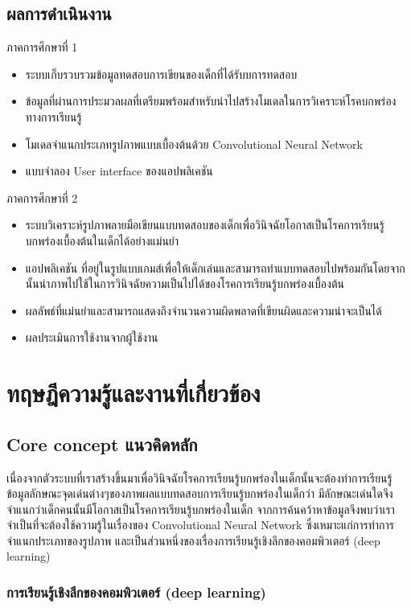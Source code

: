 \documentclass[12pt,oneside,openright,a4paper]{cpe-thai-project}
\begin{document}
\section{ผลการดำเนินงาน}
ภาคการศึกษาที่ 1 
\begin{itemize}
  \item ระบบเก็บรวบรวมข้อมูลทดสอบการเขียนของเด็กที่ได้รับบการทดสอบ
  \item ข้อมูลที่ผ่านการประมวลผลที่เตรียมพร้อมสำหรับนำไปสร้างโมเดลในการวิเคราะห์โรคบกพร่องทางการเรียนรู้
  \item โมเดลจำแนกประเภทรูปภาพแบบเบื้องต้นด้วย Convolutional Neural Network
  \item แบบจำลอง User interface ของแอปพลิเคชัน
\end{itemize}
ภาคการศึกษาที่ 2 
\begin{itemize}
  \item ระบบวิเคราะห์รูปภาพลายมือเขียนแบบทดสอบของเด็กเพื่อวินิจฉัยโอกาสเป็นโรคการเรียนรู้บกพร่องเบื้องต้นในเด็กได้อย่างแม่นยำ
  \item แอปพลิเคชัน ที่อยู่ในรูปแบบเกมส์เพื่อให้เด็กเล่นและสามารถทำแบบทดสอบไปพร้อมกันโดยจากนั้นนำภาพไปใช้ในการวินิจฉัยความเป็นไปได้ของโรคการเรียนรู้บกพร่องเบื้องต้น
  \item ผลลัพธ์ที่แม่นยำและสามารถแสดงถึงจำนวนความผิดพลาดที่เขียนผิดและความน่าจะเป็นได้
  \item ผลประเมินการใช้งานจากผู้ใช้งาน
\end{itemize}
\chapter{ทฤษฎีความรู้และงานที่เกี่ยวข้อง}
\section{Core concept แนวคิดหลัก}
เนื่องจากตัวระบบที่เราสร้างขึ้นมาเพื่อวินิจฉัยโรคการเรียนรู้บกพร่องในเด็กนั้นจะต้องทำการเรียนรู้ข้อมูลลักษณะจุดเด่นต่างๆของภาพผลแบบทดสอบการเรียนรู้บกพร่องในเด็กว่า 
มีลักษณะเด่นใดจึงจำแนกว่าเด็กคนนั้นมีโอกาสเป็นโรคการเรียนรู้บกพร่องในเด็ก 
จากการค้นคว้าหาข้อมูลจึงพบว่าเราจำเป็นที่จะต้องใช้ความรู้ในเรื่องของ Convolutional Neural Network 
ซึ่งเหมาะแก่การทำการจำแนกประเภทของรูปภาพ และเป็นส่วนหนึ่งของเรื่องการเรียนรู้เชิงลึกของคอมพิวเตอร์ (deep learning)

\subsection{การเรียนรู้เชิงลึกของคอมพิวเตอร์ (deep learning)}
\end{document}
